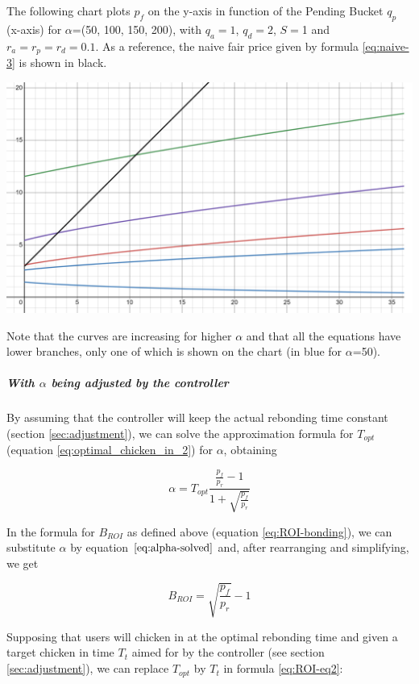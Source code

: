 \documentclass{article}
\begin{document}
The following chart plots $p_f$ on the y-axis in function of the Pending Bucket $q_p$ (x-axis) for $\alpha$=(50, 100, 150, 200), with $q_a=1$, $q_d=2$, $S=$1 and $r_a=r_p=r_d=0.1$. As a reference, the naive fair price given by formula \ref{eq:naive-3} is shown in black.

\includegraphics[width=\linewidth]{./ChickenBonds_Whitepaper_comparison_price.png}

Note that the curves are increasing for higher $\alpha$ and that all the equations have lower branches, only one of which is shown on the chart (in blue for $\alpha$=50). 

\subparagraph{With $\alpha$ being adjusted by the controller}
By assuming that the controller will keep the actual rebonding time constant (section \ref{sec:adjustment}), we can solve the approximation formula for $T_{opt}$ (equation \ref{eq:optimal_chicken_in_2}) for $\alpha$, obtaining

\begin{equation}
  \label{eq:alpha-solved}
  \alpha = T_{opt}\frac{\frac{p_f}{p_r} - 1}{1 + \sqrt{\frac{p_f}{p_r}}}
\end{equation} 

In the formula for $B_{ROI}$ as defined above (equation \ref{eq:ROI-bonding}), we can substitute $\alpha$ by equation $\ref{eq:alpha-solved}$ and, after rearranging and simplifying, we get

\begin{equation}
  \label{eq:BROI-controller}
    B_{ROI} = \sqrt{\frac{p_f}{p_r}} - 1
\end{equation} 

Supposing that users will chicken in at the optimal rebonding time and given a target chicken in time $T_t$ aimed for by the controller (see section \ref{sec:adjustment}), we can replace $T_{opt}$ by $T_t$ in formula \ref{eq:ROI-eq2}:
\end{document}
